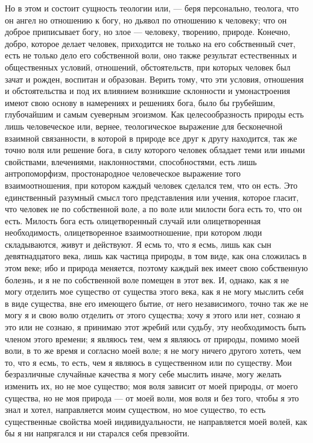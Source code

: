 \documentclass[12pt]{article}
\begin{document}
Но в этом и состоит сущность теологии или, --- беря персонально, теолога, что он ангел но отношению к богу, но дьявол по отношению к человеку; что он доброе приписывает богу, но злое --- человеку, творению, природе. Конечно, добро, которое делает человек, приходится не только на его собственный счет, есть не только дело его собственной воли, оно также результат естественных и общественных условий, отношений, обстоятельств, при которых человек был зачат и рожден, воспитан и образован. Верить тому, что эти условия, отношения и обстоятельства и под их влиянием возникшие склонности и умонастроения имеют свою основу в намерениях и решениях бога, было бы грубейшим, глубочайшим и самым суеверным эгоизмом. Как целесообразность природы есть лишь человеческое или, вернее, теологическое выражение для бесконечной взаимной связанности, в которой в природе все друг к другу находится, так же точно воля или решение бога, в силу которого человек обладает теми или иными свойствами, влечениями, наклонностями, способностями, есть лишь антропоморфизм, простонародное человеческое выражение того взаимоотношения, при котором каждый человек сделался тем, что он есть. Это единственный разумный смысл того представления или учения, которое гласит, что человек не по собственной воле, а по воле или милости бога есть то, что он есть. Милость бога есть олицетворенный случай или олицетворенная необходимость, олицетворенное взаимоотношение, при котором люди складываются, живут и действуют. Я есмь то, что я есмь, лишь как сын девятнадцатого века, лишь как частица природы, в том виде, как она сложилась в этом веке; ибо и природа меняется, поэтому каждый век имеет свою собственную болезнь, и я не по собственной воле помещен в этот век. И, однако, как я не могу отделить мое существо от существа этого века, как я не могу мыслить себя в виде существа, вне его имеющего бытие, от него независимого, точно так же не могу я и свою волю отделить от этого существа; хочу я этого или нет, сознаю я это или не сознаю, я принимаю этот жребий или судьбу, эту необходимость быть членом этого времени; я являюсь тем, чем я являюсь от природы, помимо моей воли, в то же время и согласно моей воле; я не могу ничего другого хотеть, чем то, что я есмь, то есть, чем я являюсь в существенном или по существу. Мои безразличные случайные качества я могу себе мыслить иначе, могу желать изменить их, но не мое существо; моя воля зависит от моей природы, от моего существа, но не моя природа --- от моей воли, моя воля и без того, чтобы я это знал и хотел, направляется моим существом, но мое существо, то есть существенные свойства моей индивидуальности, не направляется моей волей, как бы я ни напрягался и ни старался себя превзойти. 
\end{document}

